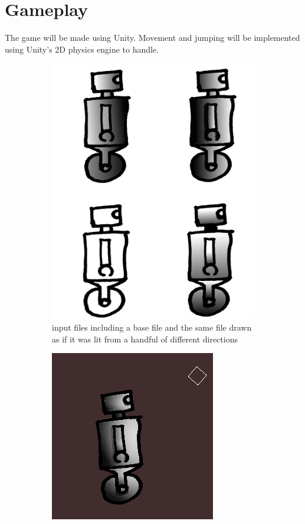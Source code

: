 \section{Gameplay}

The game will be made using Unity. Movement and jumping will be implemented using Unity's 2D physics engine to handle.

\begin{figure}[ht]
\centering
\begin{subfigure}{.5\textwidth}
  \centering
  \includegraphics[scale=0.2, trim = 0cm 0cm 0cm 2cm]{images/in}
  \caption{input files including a base file and the same file drawn as if it was lit from a handful of different directions}
  \label{fig:sub1:pl}
\end{subfigure}%
\begin{subfigure}{.5\textwidth}
  \centering
  \includegraphics[scale=0.9, trim = 0cm 0cm 0cm 0.5cm]{images/out}	

\end{subfigure}
\end{figure}

